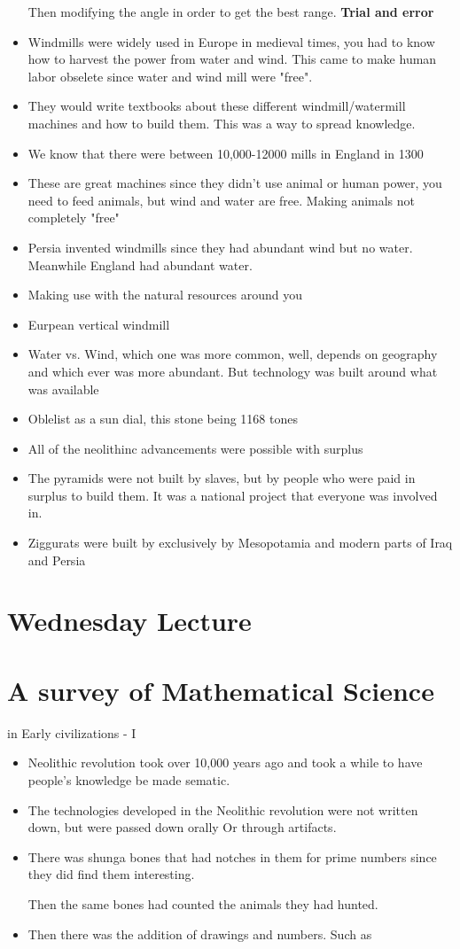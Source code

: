 \documentclass{article}
\begin{document}
\begin{itemize}
  Then modifying the angle in order to get the best range. \textbf{Trial and error}
\item Windmills were widely used in Europe in medieval times,
  you had to know how to harvest the power from water and wind. This came to
  make human labor obselete since water and wind mill were "free".
\item They would write textbooks about these different windmill/watermill machines
  and how to build them. This was a way to spread knowledge.
\item We know that there were between 10,000-12000 mills in England in 1300
\item These are great machines since they didn't use animal or human power,
  you need to feed animals, but wind and water are free. Making animals not completely "free"
\item Persia invented windmills since they had abundant wind but no water.
  Meanwhile England had abundant water.
\item Making use with the natural resources around you
\item Eurpean vertical windmill
\item Water vs. Wind, which one was more common, well, depends on geography and which
  ever was more abundant. But technology was built around what was available
\item Oblelist as a sun dial, this stone being 1168 tones
\item All of the neolithinc advancements were possible with surplus
\item The pyramids were not built by slaves, but by people who were paid in surplus
  to build them. It was a national project that everyone was involved in.
\item Ziggurats were built by exclusively by Mesopotamia and modern parts of Iraq and Persia
\end{itemize}

\newpage
\section*{Wednesday Lecture}

\section{A survey of Mathematical Science}
in Early civilizations - I

\begin{itemize}
  \item Neolithic revolution took over 10,000 years ago
    and took a while to have people's knowledge be made sematic.
  \item The technologies developed in the Neolithic
    revolution were not written down, but were passed down orally
    Or through artifacts.
  \item There was shunga bones that had notches in them
    for prime numbers since they did find them interesting.

    Then the same bones had counted the animals they had hunted.
  \item Then there was the addition of drawings and numbers. Such as
\end{itemize}
\end{document}
